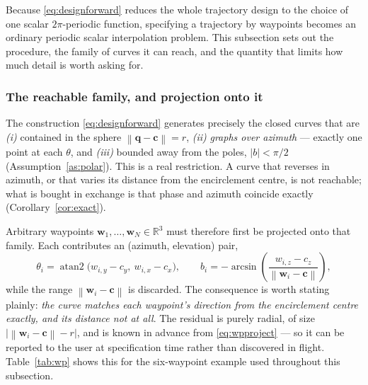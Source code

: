 \documentclass[11pt,a4paper]{article}
\newcommand{\R}{\mathbb{R}}
\newcommand{\q}{\bm{q}}
\newcommand{\cv}{\bm{c}}
\newcommand{\norm}[1]{\left\lVert#1\right\rVert}
\begin{document}
Because \eqref{eq:designforward} reduces the whole trajectory design to the
choice of one scalar $2\pi$-periodic function, specifying a trajectory by
waypoints becomes an ordinary periodic scalar interpolation problem. This
subsection sets out the procedure, the family of curves it can reach, and the
quantity that limits how much detail is worth asking for.

\subsubsection*{The reachable family, and projection onto it}

The construction \eqref{eq:designforward} generates precisely the closed curves
that are
\emph{(i)} contained in the sphere $\norm{\q-\cv}=r$,
\emph{(ii)} \emph{graphs over azimuth} --- exactly one point at each $\theta$, and
\emph{(iii)} bounded away from the poles, $|b|<\pi/2$ (Assumption~\ref{as:polar}).
This is a real restriction. A curve that reverses in azimuth, or that varies
its distance from the encirclement centre, is not reachable; what is bought in
exchange is that phase and azimuth coincide exactly
(Corollary~\ref{cor:exact}).

Arbitrary waypoints $\bm w_1,\dots,\bm w_N \in \R^3$ must therefore first be
projected onto that family. Each contributes an (azimuth, elevation) pair,
\begin{equation}
\theta_i = \operatorname{atan2}\big(w_{i,y}-c_y,\ w_{i,x}-c_x\big),
\qquad
b_i = -\arcsin\!\left(\frac{w_{i,z}-c_z}{\norm{\bm w_i - \cv}}\right),
\label{eq:wpproject}
\end{equation}
while the range $\norm{\bm w_i-\cv}$ is discarded. The consequence is worth
stating plainly: \emph{the curve matches each waypoint's direction from the
encirclement centre exactly, and its distance not at all}. The residual is
purely radial, of size $\big|\norm{\bm w_i-\cv}-r\big|$, and is known in advance
from \eqref{eq:wpproject} --- so it can be reported to the user at specification
time rather than discovered in flight. Table~\ref{tab:wp} shows this for the
six-waypoint example used throughout this subsection.
\end{document}
